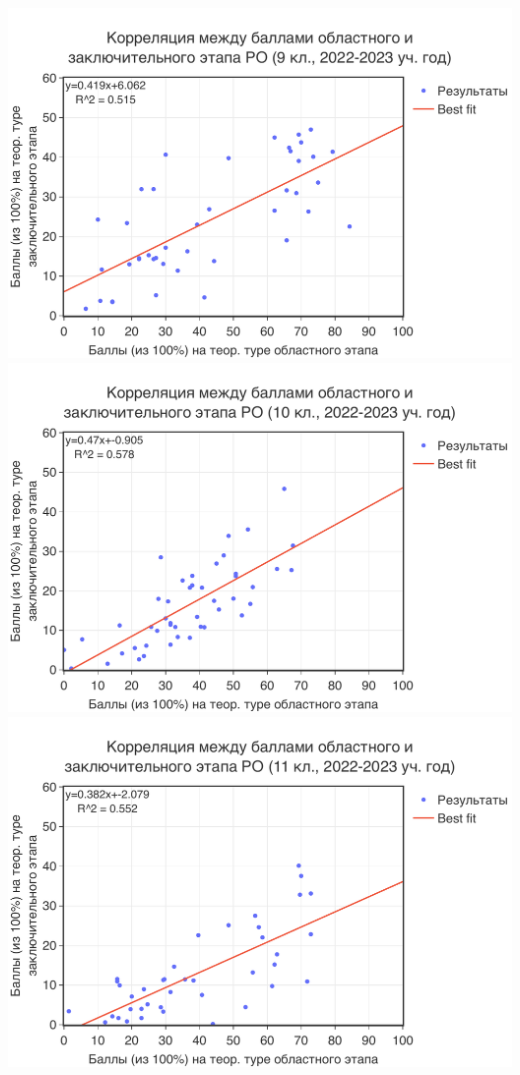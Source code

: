 \includegraphics[width=\linewidth]{../export/pdf/trajectory/gr9-data.pdf}
\includegraphics[width=\linewidth]{../export/pdf/trajectory/gr10-data.pdf}
\includegraphics[width=\linewidth]{../export/pdf/trajectory/gr11-data.pdf}

